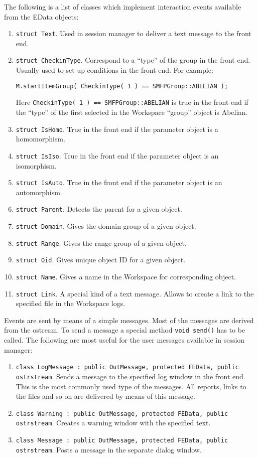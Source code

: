 \documentclass[12pt]{article}
\begin{document}
The following is a list  of classes which implement interaction events
available from the EData objects:
\begin{enumerate}
\item  {\tt struct Text}. Used in session manager to deliver a text message
to the front end.
\item {\tt  struct CheckinType}. Correspond to a ``type'' of the group in the
front end.
Usually used to set up conditions in the front end. For example:
\footnotesize
\begin{verbatim}
M.startItemGroup( CheckinType( 1 ) == SMFPGroup::ABELIAN );
\end{verbatim}
\normalsize
Here {\tt   CheckinType( 1 ) == SMFPGroup::ABELIAN} is true in the
front end if
the
``type'' of the first selected in the Workspace ``group'' object is Abelian.
\item {\tt  struct IsHomo}. True in the front end if the  parameter
object is a
homomorphism.
\item {\tt  struct IsIso}. True in the front end if the  parameter
object is an
isomorphism.
\item {\tt  struct IsAuto}. True in the front end if the  parameter object is
an
automorphism.
\item {\tt  struct Parent}. Detects the parent for a given object.
\item {\tt  struct Domain}. Gives the domain group of a given object.
\item {\tt struct Range}. Gives the range group of a given object.
\item {\tt struct Oid}. Gives  unique object ID for a given object.
\item {\tt  struct Name}. Gives a name in the Workspace for corresponding
object.
\item {\tt struct Link}. A special kind of a text message. Allows to create a
link to the specified file in  the Workspace logs.
\end{enumerate}

Events are sent by means of a simple messages. Most of the messages are derived
from the ostream. To send a message a special method {\tt void send()} has to
be called.  The following are most useful for the user messages available
in session manager:
\begin{enumerate}
\item {\tt class LogMessage : public OutMessage, protected FEData, public
ostrstream}.
Sends a message to the specified log window in the front end.
This is the most commonly used type of the messages. All reports, links to the
files and so on are delivered by means of this message.

\item {\tt class Warning : public OutMessage, protected FEData, public
ostrstream}.
Creates a warning window with the specified text.

\item {\tt class Message : public OutMessage, protected FEData, public
ostrstream}. Posts
a message in the separate dialog window.
\end{enumerate}
\end{document}
